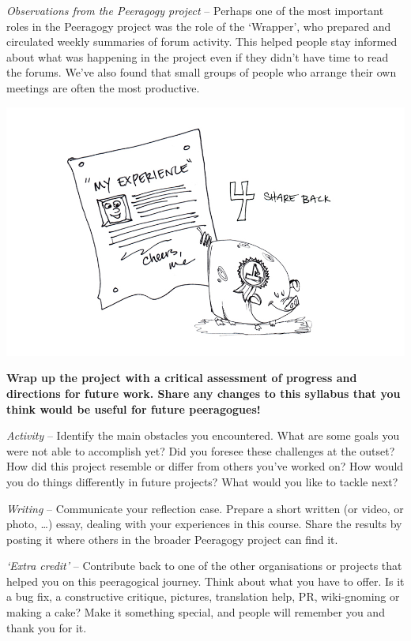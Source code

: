 \emph{Observations from the Peeragogy project} -- Perhaps one of the
most important roles in the Peeragogy project was the role of the
`Wrapper', who prepared and circulated weekly summaries of forum
activity. This helped people stay informed about what was happening in
the project even if they didn't have time to read the forums. We've also
found that small groups of people who arrange their own meetings are
often the most productive.

\begin{center}
\includegraphics{../pictures/OpenBook-2-4.jpg}
\end{center}

\textbf{Wrap up the project with a critical assessment of progress and
directions for future work. Share any changes to this syllabus that you
think would be useful for future peeragogues!}

\emph{Activity} -- Identify the main obstacles you encountered. What are
some goals you were not able to accomplish yet? Did you foresee these
challenges at the outset? How did this project resemble or differ from
others you've worked on? How would you do things differently in future
projects? What would you like to tackle next?

\emph{Writing} -- Communicate your reflection case. Prepare a short
written (or video, or photo, \ldots{}) essay, dealing with your
experiences in this course. Share the results by posting it where others
in the broader Peeragogy project can find it.

\emph{`Extra credit'} -- Contribute back to one of the other
organisations or projects that helped you on this peeragogical journey.
Think about what you have to offer. Is it a bug fix, a constructive
critique, pictures, translation help, PR, wiki-gnoming or making a cake?
Make it something special, and people will remember you and thank you
for it.

